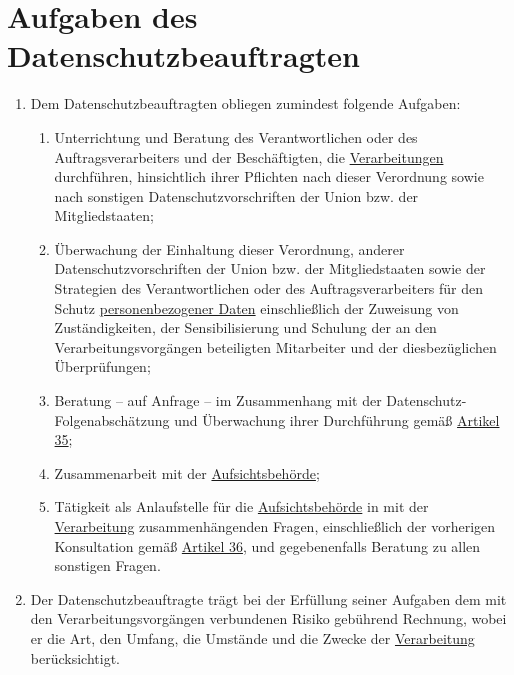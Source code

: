 \chapter{Aufgaben des Datenschutzbeauftragten}
\label{ch:39}


\begin{enumerate}

  \item Dem Datenschutzbeauftragten obliegen zumindest folgende Aufgaben:
  \label{itm:39-1}

  \begin{enumerate}
  
    \item Unterrichtung und Beratung des Verantwortlichen oder des Auftragsverarbeiters und der Beschäftigten, die
     \hyperref[itm:04-2]{Verarbeitungen} durchführen, hinsichtlich ihrer Pflichten nach dieser Verordnung sowie nach sonstigen
     Datenschutzvorschriften der Union bzw. der Mitgliedstaaten;
    \label{itm:39-1a}

    \item Überwachung der Einhaltung dieser Verordnung, anderer Datenschutzvorschriften der Union bzw. der
     Mitgliedstaaten sowie der Strategien des Verantwortlichen oder des Auftragsverarbeiters für den Schutz
     \hyperref[itm:04-1]{personenbezogener Daten} einschließlich der Zuweisung von Zuständigkeiten, der Sensibilisierung und Schulung der an
     den Verarbeitungsvorgängen beteiligten Mitarbeiter und der diesbezüglichen Überprüfungen;
    \label{itm:39-1b}

    \item Beratung -- auf Anfrage -- im Zusammenhang mit der Datenschutz-Folgenabschätzung und Überwachung ihrer
     Durchführung gemäß \hyperref[ch:35]{Artikel 35};
    \label{itm:39-1c}

    \item Zusammenarbeit mit der \hyperref[itm:04-21]{Aufsichtsbehörde};
    \label{itm:39-1d}

    \item Tätigkeit als Anlaufstelle für die \hyperref[itm:04-21]{Aufsichtsbehörde} in mit der \hyperref[itm:04-2]{Verarbeitung} zusammenhängenden Fragen,
     einschließlich der vorherigen Konsultation gemäß \hyperref[ch:36]{Artikel 36}, und gegebenenfalls Beratung zu
     allen sonstigen Fragen.
    \label{itm:39-1e}

  \end{enumerate}

  \item Der Datenschutzbeauftragte trägt bei der Erfüllung seiner Aufgaben dem mit den Verarbeitungsvorgängen
   verbundenen Risiko gebührend Rechnung, wobei er die Art, den Umfang, die Umstände und die Zwecke der \hyperref[itm:04-2]{Verarbeitung}
   berücksichtigt.
  \label{itm:39-e}

\end{enumerate}


